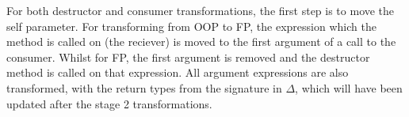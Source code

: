 \documentclass[ oneside,%
                    author={James Elgar},
                    degree={MEng},
                     title={Bidirectional transformer between functional and \\ object-oriented programming in Rust},
                  subtitle={}]{dissertation}
\begin{document}
For both destructor and consumer transformations, the first step is to move the self parameter. For transforming from OOP to FP, the expression which the method is called on (the reciever) is moved to the first argument of a call to the consumer. Whilst for FP, the first argument is removed and the destructor method is called on that expression. All argument expressions are also transformed, with the return types from the signature in $\Delta$, which will have been updated after the stage 2 transformations.





\end{document}
